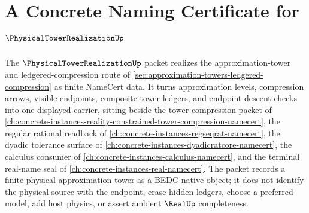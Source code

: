 \chapter{A Concrete Naming Certificate for $\PhysicalTowerRealizationUp$}
\label{ch:concrete-instances-physical-tower-realization-namecert}

The $\PhysicalTowerRealizationUp$ packet realizes the approximation-tower and ledgered-compression route of \autoref{sec:approximation-towers-ledgered-compression} as finite NameCert data. It turns approximation levels, compression arrows, visible endpoints, composite tower ledgers, and endpoint descent checks into one displayed carrier, sitting beside the tower-compression packet of \autoref{ch:concrete-instances-reality-constrained-tower-compression-namecert}, the regular rational readback of \autoref{ch:concrete-instances-regseqrat-namecert}, the dyadic tolerance surface of \autoref{ch:concrete-instances-dyadicratcore-namecert}, the calculus consumer of \autoref{ch:concrete-instances-calculus-namecert}, and the terminal real-name seal of \autoref{ch:concrete-instances-real-namecert}. The packet records a finite physical approximation tower as a BEDC-native object; it does not identify the physical source with the endpoint, erase hidden ledgers, choose a preferred model, add host physics, or assert ambient $\RealUp$ completeness.


